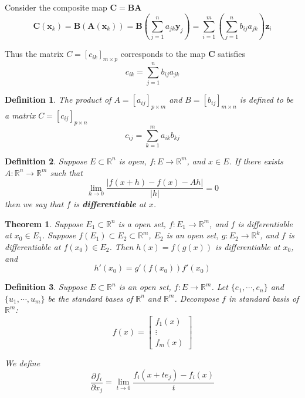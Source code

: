 \documentclass[aps,pra,onecolumn,notitlepage,superscriptaddress]{revtex4-1}
\newcommand{\R}{\mathbb{R}}
\newcommand{\st}[1]{\mathbf{#1}}
\newtheorem{theo}{Theorem}
\newtheorem{defi}{Definition}
\begin{document}
        Consider the composite map $\st{C = BA}$
        \begin{equation}
            \st{C}(\st{x}_k) = \st{B}(\st{A}(\st{x}_k)) = \st{B}(\sum_{j=1}^n a_{jk}\st{y}_j) = \sum_{i=1}^m \left(\sum_{j=1}^n b_{ij}a_{jk} \right) \st{z}_i
        \end{equation}

        Thus the matrix $C = [c_{ik}]_{m \times p}$ corresponds to the map $\st{C}$ satisfies
        \begin{equation}
            c_{ik} = \sum_{j=1}^n b_{ij}a_{jk}
        \end{equation}

    \begin{defi}
        The product of $A = [a_{ij}]_{p \times m}$ and $B = [b_{ij}]_{m \times n}$ is defined to be a matrix $C = [c_{ij}]_{p \times n}$
        \begin{equation}
            c_{ij} = \sum_{k=1}^m a_{ik}b_{kj}
        \end{equation}
    \end{defi}

    \begin{defi}
        Suppose $E \subset \R^n$ is open, $f: E \to \R^m$, and $x \in E$. If there exists $A : \R^n \to \R^m$ such that
        \begin{equation}
            \lim_{h \to 0} \frac{|f(x+h)-f(x)-Ah|}{|h|} = 0
        \end{equation}
        then we say that $f$ is \textbf{differentiable} at $x$.
    \end{defi}

    \begin{theo}
        Suppose $E_1 \subset \R^n$ is a open set, $f : E_1 \to \R^m$, and $f$ is differentiable at $x_0 \in E_1$. Suppose $f(E_1) \subset E_2 \subset \R^m$, $E_2$ is an open set, $g : E_2 \to \R^k$, and $f$ is differentiable at $f(x_0) \in E_2$. Then $h(x) = f(g(x))$ is differentiable at $x_0$, and
        \begin{equation}
            h'(x_0) = g'(f(x_0)) f'(x_0)
        \end{equation}
    \end{theo}

    \begin{defi}
        Suppose $E \subset \R^n$ is an open set, $f: E \to \R^m$. Let $\{e_1, \cdots, e_n\}$ and $\{u_1, \cdots, u_m\}$ be the standard bases of $\R^n$ and $\R^m$. Decompose $f$ in standard basis of $\R^m$:
        \begin{equation}
            f(x) = \begin{bmatrix}
                f_1(x) \\ \vdots \\ f_m(x)
            \end{bmatrix}
        \end{equation}

        We define
        \begin{equation}
            \frac{\partial f_i}{\partial x_j} = \lim_{t \to 0} \frac{f_i(x + te_j)-f_i(x)}{t}
        \end{equation}
    \end{defi}
\end{document}
